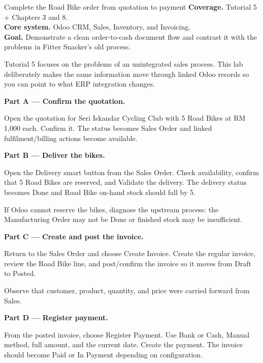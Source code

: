 
\begin{labproject}{Complete the Road Bike order from quotation to payment}
\textbf{Coverage.} Tutorial 5 + Chapters 3 and 8.\\
\textbf{Core system.} Odoo CRM, Sales, Inventory, and Invoicing.\\
\textbf{Goal.} Demonstrate a clean order-to-cash document flow and contrast it with the problems in Fitter Snacker's old process.

\begin{labmode}
Tutorial 5 focuses on the problems of an unintegrated sales process. This lab deliberately makes the same information move through linked Odoo records so you can point to what ERP integration changes.
\end{labmode}

\medskip\noindent\textbf{Part A --- Confirm the quotation.}

Open the quotation for Seri Iskandar Cycling Club with 5 Road Bikes at RM 1,000 each. Confirm it. The status becomes Sales Order and linked fulfilment/billing actions become available.

\medskip\noindent\textbf{Part B --- Deliver the bikes.}

Open the Delivery smart button from the Sales Order. Check availability, confirm that 5 Road Bikes are reserved, and Validate the delivery. The delivery status becomes Done and Road Bike on-hand stock should fall by 5.

If Odoo cannot reserve the bikes, diagnose the upstream process: the Manufacturing Order may not be Done or finished stock may be insufficient.

\medskip\noindent\textbf{Part C --- Create and post the invoice.}

Return to the Sales Order and choose Create Invoice. Create the regular invoice, review the Road Bike line, and post/confirm the invoice so it moves from Draft to Posted.

Observe that customer, product, quantity, and price were carried forward from Sales.

\medskip\noindent\textbf{Part D --- Register payment.}

From the posted invoice, choose Register Payment. Use Bank or Cash, Manual method, full amount, and the current date. Create the payment. The invoice should become Paid or In Payment depending on configuration.


\end{labproject}
